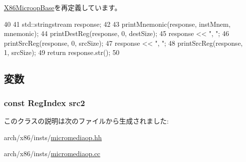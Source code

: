 \hyperlink{classX86ISA_1_1X86MicroopBase_a95d323a22a5f07e14d6b4c9385a91896}{X86MicroopBase}を再定義しています。


\begin{DoxyCode}
40     {
41         std::stringstream response;
42 
43         printMnemonic(response, instMnem, mnemonic);
44         printDestReg(response, 0, destSize);
45         response << ", ";
46         printSrcReg(response, 0, srcSize);
47         response << ", ";
48         printSrcReg(response, 1, srcSize);
49         return response.str();
50     }
\end{DoxyCode}


\subsection{変数}
\hypertarget{classX86ISA_1_1MediaOpReg_ae5f4f8a3a7b6e717a2cff2990c4ecfff}{
\subsubsection[{src2}]{\setlength{\rightskip}{0pt plus 5cm}const {\bf RegIndex} {\bf src2}}}
\label{classX86ISA_1_1MediaOpReg_ae5f4f8a3a7b6e717a2cff2990c4ecfff}


このクラスの説明は次のファイルから生成されました:\begin{DoxyCompactItemize}
\item 
arch/x86/insts/\hyperlink{micromediaop_8hh}{micromediaop.hh}\item 
arch/x86/insts/\hyperlink{micromediaop_8cc}{micromediaop.cc}\end{DoxyCompactItemize}
